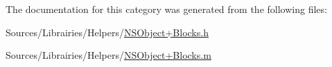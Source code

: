 The documentation for this category was generated from the following files\-:\begin{DoxyCompactItemize}
\item 
Sources/\-Librairies/\-Helpers/\hyperlink{_n_s_object_09_blocks_8h}{N\-S\-Object+\-Blocks.\-h}\item 
Sources/\-Librairies/\-Helpers/\hyperlink{_n_s_object_09_blocks_8m}{N\-S\-Object+\-Blocks.\-m}\end{DoxyCompactItemize}
